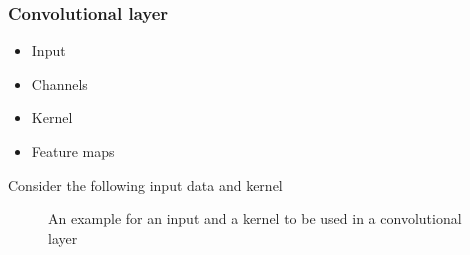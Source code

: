 \documentclass{beamer}
\begin{document}
\begin{frame}
    \frametitle{Convolutional layer}
    \begin{itemize}
        \item Input
        \item Channels
        \item Kernel
        \item Feature maps
    \end{itemize}
    \pause
    Consider the following input data and kernel

    \begin{figure}
        \centering
        \hfill
        \hfill
        \hfill
        \null
        \caption{An example for an input and a kernel to be used in a convolutional layer}
        \label{fig:conv_input_and_kernel}
    \end{figure}
\end{frame}
\end{document}

